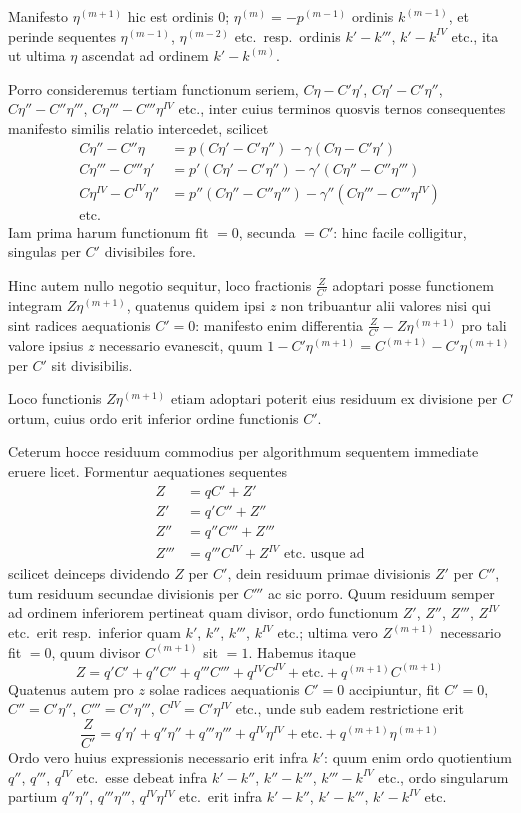 \documentclass[12pt,a4paper]{article}
\begin{document}
Manifesto $\eta^{(m+1)}$ hic est ordinis $0$; $\eta^{(m)}=-p^{(m-1)}$ ordinis $k^{(m-1)}$, et perinde sequentes $\eta^{(m-1)}$, $\eta^{(m-2)}$ etc.\ resp.\ ordinis $k'-k'''$, $k'-k^{IV}$ etc., ita ut ultima $\eta$ ascendat ad ordinem $k'-k^{(m)}$.

Porro consideremus tertiam functionum seriem, $C\eta-C'\eta'$, $C\eta'-C'\eta''$, $C\eta''-C''\eta'''$, $C\eta'''-C'''\eta^{IV}$ etc., inter cuius terminos quosvis ternos consequentes manifesto similis relatio intercedet, scilicet
\begin{align*}
C\eta''-C''\eta &= p(C\eta'-C'\eta'') - \gamma(C\eta-C'\eta')\\
C\eta'''-C'''\eta' &= p'(C\eta'-C'\eta'') - \gamma'(C\eta''-C''\eta''')\\
C\eta^{IV}-C^{IV}\eta'' &= p''(C\eta''-C''\eta''') - \gamma''(C\eta'''-C'''\eta^{IV})\\
\text{etc.}&
\end{align*}
Iam prima harum functionum fit $=0$, secunda $=C'$: hinc facile colligitur, singulas per $C'$ divisibiles fore.

Hinc autem nullo negotio sequitur, loco fractionis $\frac{Z}{C'}$ adoptari posse functionem integram $Z\eta^{(m+1)}$, quatenus quidem ipsi $z$ non tribuantur alii valores nisi qui sint radices aequationis $C'=0$: manifesto enim differentia $\frac{Z}{C'}-Z\eta^{(m+1)}$ pro tali valore ipsius $z$ necessario evanescit, quum $1-C'\eta^{(m+1)} = C^{(m+1)}-C'\eta^{(m+1)}$ per $C'$ sit divisibilis.

Loco functionis $Z\eta^{(m+1)}$ etiam adoptari poterit eius residuum ex divisione per $C$ ortum, cuius ordo erit inferior ordine functionis $C'$.

Ceterum hocce residuum commodius per algorithmum sequentem immediate eruere licet. Formentur aequationes sequentes
\begin{align*}
Z &= qC' + Z'\\
Z' &= q'C'' + Z''\\
Z'' &= q''C''' + Z'''\\
Z''' &= q'''C^{IV} + Z^{IV} \text{ etc.\ usque ad}
\end{align*}
scilicet deinceps dividendo $Z$ per $C'$, dein residuum primae divisionis $Z'$ per $C''$, tum residuum secundae divisionis per $C'''$ ac sic porro. Quum residuum semper ad ordinem inferiorem pertineat quam divisor, ordo functionum $Z'$, $Z''$, $Z'''$, $Z^{IV}$ etc.\ erit resp.\ inferior quam $k'$, $k''$, $k'''$, $k^{IV}$ etc.; ultima vero $Z^{(m+1)}$ necessario fit $=0$, quum divisor $C^{(m+1)}$ sit $=1$. Habemus itaque
\[
Z = q'C' + q''C'' + q'''C''' + q^{IV}C^{IV} + \text{etc.} + q^{(m+1)}C^{(m+1)}
\]
Quatenus autem pro $z$ solae radices aequationis $C'=0$ accipiuntur, fit $C'=0$, $C''=C'\eta''$, $C'''=C'\eta'''$, $C^{IV}=C'\eta^{IV}$ etc., unde sub eadem restrictione erit
\[
\frac{Z}{C'} = q'\eta' + q''\eta'' + q'''\eta''' + q^{IV}\eta^{IV} + \text{etc.} + q^{(m+1)}\eta^{(m+1)}
\]
Ordo vero huius expressionis necessario erit infra $k'$: quum enim ordo quotientium $q''$, $q'''$, $q^{IV}$ etc.\ esse debeat infra $k'-k''$, $k''-k'''$, $k'''-k^{IV}$ etc., ordo singularum partium $q''\eta''$, $q'''\eta'''$, $q^{IV}\eta^{IV}$ etc.\ erit infra $k'-k''$, $k'-k'''$, $k'-k^{IV}$ etc.
\end{document}
